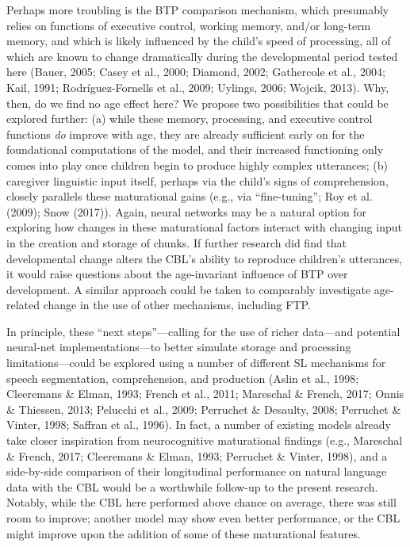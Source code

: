 \documentclass[
  english,
  man,floatsintext]{apa6}
\begin{document}
Perhaps more troubling is the BTP comparison mechanism, which presumably relies on functions of executive control, working memory, and/or long-term memory, and which is likely influenced by the child's speed of processing, all of which are known to change dramatically during the developmental period tested here (Bauer, 2005; Casey et al., 2000; Diamond, 2002; Gathercole et al., 2004; Kail, 1991; Rodríguez-Fornells et al., 2009; Uylings, 2006; Wojcik, 2013). Why, then, do we find no age effect here? We propose two possibilities that could be explored further: (a) while these memory, processing, and executive control functions \emph{do} improve with age, they are already sufficient early on for the foundational computations of the model, and their increased functioning only comes into play once children begin to produce highly complex utterances; (b) caregiver linguistic input itself, perhaps via the child's signs of comprehension, closely parallels these maturational gains (e.g., via \enquote{fine-tuning}; Roy et al. (2009); Snow (2017)). Again, neural networks may be a natural option for exploring how changes in these maturational factors interact with changing input in the creation and storage of chunks. If further research did find that developmental change alters the CBL's ability to reproduce children's utterances, it would raise questions about the age-invariant influence of BTP over development. A similar approach could be taken to comparably investigate age-related change in the use of other mechanisms, including FTP.

In principle, these \enquote{next steps}---calling for the use of richer data---and potential neural-net implementations---to better simulate storage and processing limitations---could be explored using a number of different SL mechanisms for speech segmentation, comprehension, and production (Aslin et al., 1998; Cleeremans \& Elman, 1993; French et al., 2011; Mareschal \& French, 2017; Onnis \& Thiessen, 2013; Pelucchi et al., 2009; Perruchet \& Desaulty, 2008; Perruchet \& Vinter, 1998; Saffran et al., 1996). In fact, a number of existing models already take closer inspiration from neurocognitive maturational findings (e.g., Mareschal \& French, 2017; Cleeremans \& Elman, 1993; Perruchet \& Vinter, 1998), and a side-by-side comparison of their longitudinal performance on natural language data with the CBL would be a worthwhile follow-up to the present research. Notably, while the CBL here performed above chance on average, there was still room to improve; another model may show even better performance, or the CBL might improve upon the addition of some of these maturational features.
\end{document}
